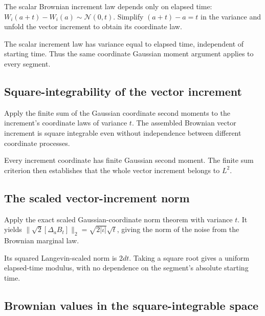 \documentclass[11pt,a4paper]{report}
\begin{document}
The scalar Brownian increment law depends only on elapsed time: \(W_i(a+t)-W_i(a)\sim\mathcal N(0,t)\). Simplify \((a+t)-a=t\) in the variance and unfold the vector increment to obtain its coordinate law.



The scalar increment law has variance equal to elapsed time, independent of starting time. Thus the same coordinate Gaussian moment argument applies to every segment.

\subsection{\texorpdfstring{Square-integrability of the vector increment}{Square-integrability of the vector increment}}
\label{report-step-UnadjustedLangevin-GaussianCoordinates-lean-12}


Apply the finite sum of the Gaussian coordinate second moments to the increment's coordinate laws of variance \(t\). The assembled Brownian vector increment is square integrable even without independence between different coordinate processes.



Every increment coordinate has finite Gaussian second moment. The finite sum criterion then establishes that the whole vector increment belongs to \(L^2\).

\subsection{\texorpdfstring{The scaled vector-increment norm}{The scaled vector-increment norm}}
\label{report-step-UnadjustedLangevin-GaussianCoordinates-lean-13}


Apply the exact scaled Gaussian-coordinate norm theorem with variance \(t\). It yields \(\|\sqrt2[\Delta_aB_t]\|_2=\sqrt{2|\iota|}\sqrt t\), giving the norm of the noise from the Brownian marginal law.



Its squared Langevin-scaled norm is \(2dt\). Taking a square root gives a uniform elapsed-time modulus, with no dependence on the segment's absolute starting time.

\subsection{\texorpdfstring{Brownian values in the square-integrable space}{Brownian values in the square-integrable space}}
\label{report-step-UnadjustedLangevin-GaussianCoordinates-lean-14}
\end{document}
